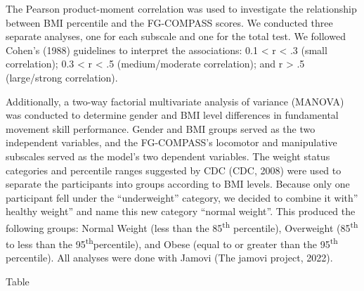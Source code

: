 \documentclass[
  jou,
  colorlinks=true,linkcolor=blue,citecolor=blue,urlcolor=blue]{apa7}
\begin{document}
The Pearson product-moment correlation was used to investigate the
relationship between BMI percentile and the FG-COMPASS scores. We
conducted three separate analyses, one for each subscale and one for the
total test. We followed Cohen's (1988) guidelines to interpret the
associations: 0.1 \textless{} \textbar{} r \textbar{} \textless{} .3
(small correlation); 0.3 \textless{} \textbar{} r \textbar{} \textless{}
.5 (medium/moderate correlation); and \textbar{} r \textbar{}
\textgreater{} .5 (large/strong correlation).

Additionally, a two-way factorial multivariate analysis of variance
(MANOVA) was conducted to determine gender and BMI level differences in
fundamental movement skill performance. Gender and BMI groups served as
the two independent variables, and the FG-COMPASS's locomotor and
manipulative subscales served as the model's two dependent variables.
The weight status categories and percentile ranges suggested by CDC
(CDC, 2008) were used to separate the participants into groups according
to BMI levels. Because only one participant fell under the
``underweight'' category, we decided to combine it with'' healthy
weight'' and name this new category ``normal weight''. This produced the
following groups: Normal Weight (less than the 85\textsuperscript{th}
percentile), Overweight (85\textsuperscript{th} to less than the
95\textsuperscript{th}percentile), and Obese (equal to or greater than
the 95\textsuperscript{th} percentile). All analyses were done with
Jamovi (The jamovi project, 2022).

Table
\end{document}

